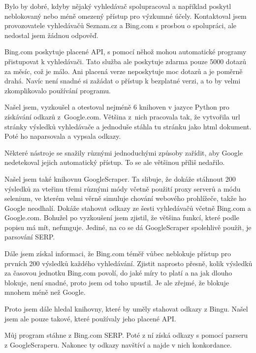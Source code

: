 \bigskip

Bylo by dobré, kdyby nějaký vyhledávač spolupracoval a například poskytl
neblokovaný nebo méně omezený přístup pro výzkumné účely. Kontaktoval jsem
provozovatele vyhledávačů Seznam.cz a Bing.com s prosbou o spolupráci, ale nedostal
jsem žádnou odpověď. 

Bing.com poskytuje placené API, s pomocí něhož mohou automatické programy
přistupovat k vyhledávači. Tato služba ale poskytuje zdarma pouze 5000 dotazů za
měsíc, což je málo. Ani placená verze neposkytuje moc dotazů a je
poměrně drahá. Navíc není snadné si zažádat o přístup k bezplatné verzi,
a to by velmi zkomplikovalo používání programu.


Našel jsem, vyzkoušel a otestoval nejméně 6 knihoven v jazyce Python pro
získávání odkazů z~Google.com. Většina z~nich pracovala tak, že vytvořila
url stránky výsledků vyhledávače a jednoduše stáhla tu stránku jako html
dokument. Poté ho naparsovala a vypsala odkazy.

Některé nástroje se snažily různými jednoduchými způsoby zařídit, aby Google
nedetekoval jejich automatický přístup. To se ale většinou příliš nedařilo.

Našel jsem také knihovnu GoogleScraper. Ta slibuje, že dokáže stáhnout 200
výsledků za vteřinu třemi různými módy včetně použití proxy serverů a módu
selenium, ve kterém velmi věrně simuluje chování webového prohlížeče, takže
ho Google neodhalí. Dokáže stahovat odkazy ze šesti vyhledávačů včetně
Bing.com a Google.com. Bohužel po vyzkoušení jsem zjistil, že většina
funkcí, které podle popisu má mít, nefunguje. Jediné, na co se dá
GoogleScraper spolehlivě použít, je parsování SERP.

Dále jsem získal informaci, že Bing.com téměř vůbec neblokuje přístup pro prvních 200
výsledků každého vyhledávání. Zjistit naprosto přesně, kolik výsledků za
časovou jednotku Bing.com povolí, do jaké míry to platí a na jak dlouho
blokuje, není snadné, proto jsem od toho upustil. Je ale zřejmé, že blokuje
mnohem méně než Google.

Proto jsem dále hledal knihovny, které by uměly stahovat odkazy z Bingu.
Našel jsem ale pouze takové, které používaly jeho placené API.


Můj program stáhne z Bing.com SERP. Poté z ní získá odkazy s pomocí parseru
z GoogleScraperu. Nakonec ty odkazy navštíví a najde v nich konkordance.

